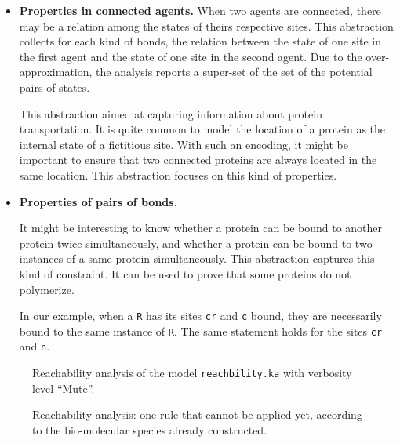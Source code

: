 \documentclass[11pt]{book}
\begin{document}
\begin{itemize}
\item \textbf{Properties in connected agents.}
When two agents are connected, there may be a relation among the states of theirs respective sites.  This abstraction \cite{Feret:SASB2016} collects for each kind of bonds, the relation between the state of one site in the first agent and the state of one site in the second agent.  Due to the over-approximation, the analysis reports a super-set of the set of the potential pairs of states.

This abstraction aimed at capturing information about protein transportation.
It is quite common to model the location of a protein as the internal state of  a fictitious site. With such an encoding, it might be important to ensure that two connected proteins are always located in the same location. This abstraction focuses on this kind of properties.

\item \textbf{Properties of pairs of bonds.}

It might be interesting to know whether a protein can be bound to another protein twice simultaneously, and whether a protein can be bound to two instances of a same protein simultaneously. This abstraction \cite{Feret:SASB2016} captures this kind of constraint. It can be used to prove that some proteins do not polymerize.

In our example, when a \texttt{R} has its sites \texttt{cr} and \texttt{c} bound, they are necessarily bound to the same instance of \texttt{R}. The same statement holds for the sites \texttt{cr} and \texttt{n}.
\end{itemize}




\begin{figure}[htbp]

\caption{Reachability analysis of the model \texttt{reachbility.ka} with verbosity level ``Mute''.}
\label{fig:reachability_mute}
\end{figure}
%
\begin{figure}[htbp]

\caption{Reachability analysis: one rule that cannot be applied yet, according to the bio-molecular species already constructed.}
\label{fig:reachability_medium_ko}
\end{figure}
\end{document}
